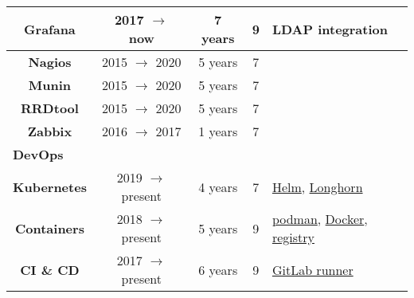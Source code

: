 \documentclass[utf8x,helvetica,narrow,english,logo,totpages]{europecv}
\newcommand{\years}{years}
\newcommand{\present}{present}
\begin{document}
\begin{europecv}
{\begin{tabular}{ | c | c | c | c | >{\centering\arraybackslash}p{2.282cm} |}
    \textbf{\hspace{-0.2cm} Grafana \hspace{-0.20cm}}
        & 2017 $\to$ now
        & 7 years
        & 9
        & \footnotesize{LDAP integration}
    \\ \hline

    \textbf{\hspace{-0.2cm} Nagios \hspace{-0.20cm}}
        & 2015 $\to$ 2020
        & 5 years
        & 7
        &
    \\ \hline

    \textbf{\hspace{-0.2cm} Munin \hspace{-0.20cm}}
        & 2015 $\to$ 2020
        & 5 years
        & 7
        &
    \\ \hline

    \textbf{\hspace{-0.2cm} RRDtool \hspace{-0.20cm}}
        & 2015 $\to$ 2020
        & 5 years
        & 7
        &
    \\ \hline

    \textbf{\hspace{-0.2cm} Zabbix \hspace{-0.20cm}}
        & 2016 $\to$ 2017
        & 1 years
        & 7
        &
    \\ \hline

    \multicolumn{5}{|l|}{\textbf{DevOps}} \\ \hline

    \textbf{\hspace{-0.2cm} Kubernetes \hspace{-0.20cm}}
        & 2019 $\to$ \present
        & 4 \years
        & 7
        & \href{https://helm.sh/}{Helm}, \href{https://longhorn.io/}{Longhorn}
    \\ \hline

    \textbf{\hspace{-0.2cm} Containers \hspace{-0.20cm}}
        & 2018 $\to$ \present
        & 5 \years
        & 9
        & \href{https://podman.io/}{podman}, \href{https://www.docker.com/}{Docker}, \href{https://hub.docker.com/_/registry}{registry}
    \\ \hline

    \textbf{\hspace{-0.2cm} CI \& CD \hspace{-0.20cm}}
        & 2017 $\to$ \present
        & 6 \years
        & 9
        & \href{https://docs.gitlab.com/runner/}{GitLab runner}
    \\ \hline


\end{tabular}}
\end{europecv}
\end{document}
